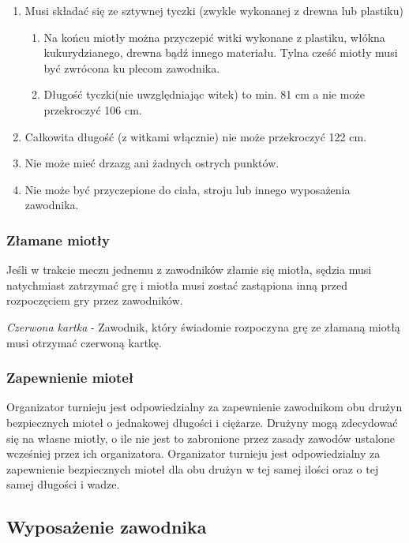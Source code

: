 \documentclass[12pt]{article}
\begin{document}
\begin{enumerate}
\item
    Musi składać się ze sztywnej tyczki (zwykle wykonanej z drewna lub
  plastiku)
  
  \begin{enumerate}
  \item
        Na końcu miotły można przyczepić witki wykonane z plastiku, włókna
    kukurydzianego, drewna bądź innego materiału. Tylna cześć miotły
    musi być zwrócona ku plecom zawodnika.
      \item
        Długość tyczki(nie uwzględniając witek) to min. 81 cm a nie może
    przekroczyć 106 cm.
      \end{enumerate}
\item
    Całkowita długość (z witkami włącznie) nie może przekroczyć 122 cm.
  \item
    Nie może mieć drzazg ani żadnych ostrych punktów.
  \item
    Nie może być przyczepione do ciała, stroju lub innego wyposażenia
  zawodnika.
  \end{enumerate}

\subsubsection{Złamane miotły}
Jeśli w trakcie meczu jednemu z
zawodników złamie się miotła, sędzia musi natychmiast zatrzymać grę i
miotła musi zostać zastąpiona inną przed rozpoczęciem gry przez
zawodników.

\emph{Czerwona kartka} - Zawodnik, który świadomie rozpoczyna grę ze
złamaną miotłą musi otrzymać czerwoną kartkę.

\subsubsection{Zapewnienie mioteł}
Organizator turnieju jest odpowiedzialny za zapewnienie zawodnikom obu
drużyn bezpiecznych mioteł o jednakowej długości i ciężarze. Drużyny
mogą zdecydować się na własne miotły, o ile nie jest to zabronione przez
zasady zawodów ustalone wcześniej przez ich organizatora. Organizator
turnieju jest odpowiedzialny za zapewnienie bezpiecznych mioteł dla obu
drużyn w tej samej ilości oraz o tej samej długości i wadze.

\subsection{Wyposażenie zawodnika}
\end{document}
